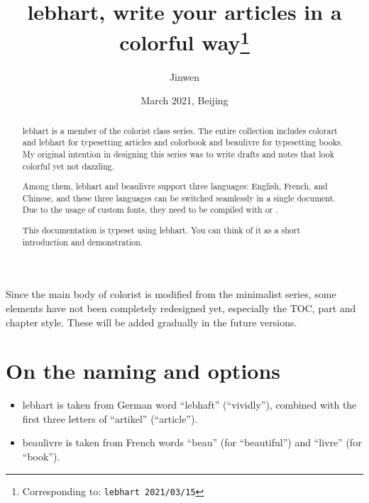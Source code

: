 \documentclass{lebhart}
\providecommand{\colorist}{\textsf{colorist}}
\providecommand{\colorart}{\textsf{colorart}}
\providecommand{\colorbook}{\textsf{colorbook}}
\providecommand{\lebhart}{\textsf{lebhart}}
\providecommand{\beaulivre}{\textsf{beaulivre}}
\begin{document}
\title{\lebhart{}, write your articles in a colorful way\thanks{Corresponding to: \texttt{\lebhart{} 2021/03/15}}}
\author{Jinwen}
\date{March 2021, Beijing}

\maketitle

\begin{abstract}
    \lebhart{} is a member of the \colorist{} class series. The entire collection includes \colorart{} and \lebhart{} for typesetting articles and \colorbook{} and \beaulivre{} for typesetting books. My original intention in designing this series was to write drafts and notes that look colorful yet not dazzling.

    Among them, \lebhart{} and \beaulivre{} support three languages: English, French, and Chinese, and these three languages can be switched seamlessly in a single document. Due to the usage of custom fonts, they need to be compiled with  or .
    
    This documentation is typeset using \lebhart{}. You can think of it as a short introduction and demonstration.
\end{abstract}

\begin{tcolorbox}[enhanced jigsaw,pad at break*=1mm,breakable,colback=yellow!25!paper,boxrule=0pt,frame hidden]
    Since the main body of \colorist{} is modified from the \textsf{minimalist} series, some elements have not been completely redesigned yet, especially the TOC, part and chapter style. These will be added gradually in the future versions.
\end{tcolorbox}

\tableofcontents

\section{On the naming and options}
\begin{itemize}
    \item \lebhart{} is taken from German word ``lebhaft'' (``vividly''), combined with the first three letters of ``artikel'' (``article'').
    \item \beaulivre{} is taken from French words ``beau'' (for ``beautiful'') and ``livre'' (for ``book'').
\end{itemize}
\end{document}
